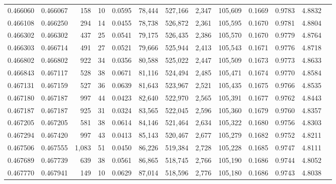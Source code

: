 \begin{tabular}{rrrrrrrrrrrrr}
0.466060 & 0.466067 &   158 &    10 &                                     0.0595 &  78,444 & 527,166 &   2,347 & 105,609 & 0.1669 & 0.9783 & 4.8832 \\
0.466108 & 0.466250 &   294 &    14 &                                     0.0455 &  78,738 & 526,872 &   2,361 & 105,595 & 0.1670 & 0.9781 & 4.8804 \\
0.466302 & 0.466302 &   437 &    25 &                                     0.0541 &  79,175 & 526,435 &   2,386 & 105,570 & 0.1670 & 0.9779 & 4.8764 \\
0.466303 & 0.466714 &   491 &    27 &                                     0.0521 &  79,666 & 525,944 &   2,413 & 105,543 & 0.1671 & 0.9776 & 4.8718 \\
0.466802 & 0.466802 &   922 &    34 &                                     0.0356 &  80,588 & 525,022 &   2,447 & 105,509 & 0.1673 & 0.9773 & 4.8633 \\
0.466843 & 0.467117 &   528 &    38 &                                     0.0671 &  81,116 & 524,494 &   2,485 & 105,471 & 0.1674 & 0.9770 & 4.8584 \\
0.467131 & 0.467159 &   527 &    36 &                                     0.0639 &  81,643 & 523,967 &   2,521 & 105,435 & 0.1675 & 0.9766 & 4.8535 \\
0.467180 & 0.467187 &   997 &    44 &                                     0.0423 &  82,640 & 522,970 &   2,565 & 105,391 & 0.1677 & 0.9762 & 4.8443 \\
0.467187 & 0.467187 &   925 &    31 &                                     0.0324 &  83,565 & 522,045 &   2,596 & 105,360 & 0.1679 & 0.9760 & 4.8357 \\
0.467205 & 0.467205 &   581 &    38 &                                     0.0614 &  84,146 & 521,464 &   2,634 & 105,322 & 0.1680 & 0.9756 & 4.8303 \\
0.467294 & 0.467420 &   997 &    43 &                                     0.0413 &  85,143 & 520,467 &   2,677 & 105,279 & 0.1682 & 0.9752 & 4.8211 \\
0.467506 & 0.467555 & 1,083 &    51 &                                     0.0450 &  86,226 & 519,384 &   2,728 & 105,228 & 0.1685 & 0.9747 & 4.8111 \\
0.467689 & 0.467739 &   639 &    38 &                                     0.0561 &  86,865 & 518,745 &   2,766 & 105,190 & 0.1686 & 0.9744 & 4.8052 \\
0.467770 & 0.467941 &   149 &    10 &                                     0.0629 &  87,014 & 518,596 &   2,776 & 105,180 & 0.1686 & 0.9743 & 4.8038 \\

\end{tabular}
